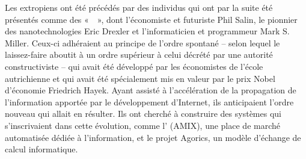 Les extropiens ont été précédés par des individus qui ont par la suite été présentés comme des «~~», dont l'économiste et futuriste Phil Salin, le pionnier des nanotechnologies Eric Drexler et l'informaticien et programmeur Mark S. Miller. Ceux-ci adhéraient au principe de l'ordre spontané -- selon lequel le laissez-faire aboutit à un ordre supérieur à celui décrété par une autorité constructiviste -- qui avait été développé par les économistes de l'école autrichienne et qui avait été spécialement mis en valeur par le prix Nobel d'économie Friedrich Hayek. Ayant assisté à l'accélération de la propagation de l'information apportée par le développement d'Internet, ils anticipaient l'ordre nouveau qui allait en résulter. Ils ont cherché à construire des systèmes qui s'inscrivaient dans cette évolution, comme l' (AMIX), une place de marché automatisée dédiée à l'information, et le projet Agorics, un modèle d'échange de calcul informatique.

